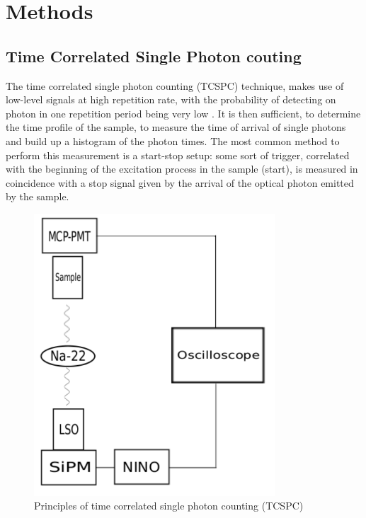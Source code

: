 
\chapter{Methods}


\section{Time Correlated Single Photon couting}

The time correlated single photon counting (TCSPC) technique, makes use of low-level signals at high repetition rate, with the probability of detecting on photon in one repetition period being very low \cite{Becker2005}.
It is then sufficient, to determine the time profile of the sample, to measure the time of arrival of single photons and build up a histogram of the photon times.
The most common method to perform this measurement is a start-stop setup: some sort of trigger, correlated with the beginning of the excitation process in the sample (start), is measured in coincidence with a stop signal given by the arrival of the optical photon emitted by the sample.
\begin{figure}[htbp]
\begin{center}
\includegraphics[width=9cm]{../Pictures/Chapter_8/electronics.pdf}
\end{center}
\caption[TCSPC technique]{Principles of time correlated single photon counting (TCSPC)}
\label{fig:daw}
\end{figure}
